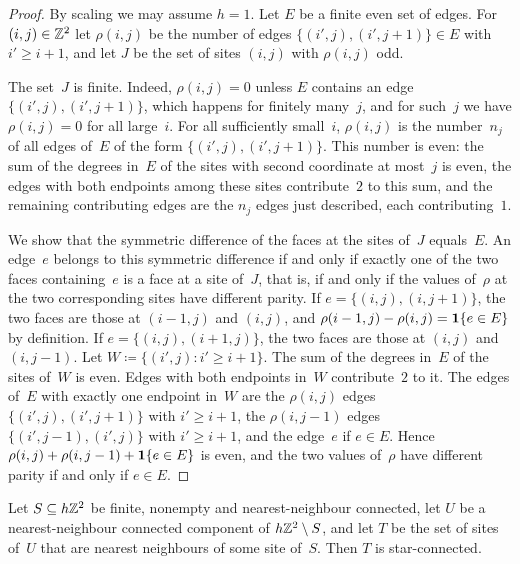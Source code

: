 \documentclass[11pt,letterpaper]{article}
\begin{document}
\begin{proof}
By scaling we may assume $h=1$. Let $E$ be a finite even set of edges. For $(i,j)\in\mathbb Z^2$ let $\rho(i,j)$ be the number of edges $\{(i',j),(i',j+1)\}\in E$ with $i'\ge i+1$, and let $J$ be the set of sites $(i,j)$ with $\rho(i,j)$ odd.

The set~$J$ is finite. Indeed, $\rho(i,j)=0$ unless $E$ contains an edge $\{(i',j),(i',j+1)\}$, which happens for finitely many~$j$, and for such~$j$ we have $\rho(i,j)=0$ for all large~$i$. For all sufficiently small~$i$, $\rho(i,j)$ is the number~$n_j$ of all edges of~$E$ of the form $\{(i',j),(i',j+1)\}$. This number is even: the sum of the degrees in~$E$ of the sites with second coordinate at most~$j$ is even, the edges with both endpoints among these sites contribute~$2$ to this sum, and the remaining contributing edges are the $n_j$ edges just described, each contributing~$1$.

We show that the symmetric difference of the faces at the sites of~$J$ equals~$E$. An edge~$e$ belongs to this symmetric difference if and only if exactly one of the two faces containing~$e$ is a face at a site of~$J$, that is, if and only if the values of~$\rho$ at the two corresponding sites have different parity. If $e=\{(i,j),(i,j+1)\}$, the two faces are those at $(i-1,j)$ and $(i,j)$, and $\rho(i-1,j)-\rho(i,j)=\mathbf{1}\{e\in E\}$ by definition. If $e=\{(i,j),(i+1,j)\}$, the two faces are those at $(i,j)$ and $(i,j-1)$. Let $W\coloneqq\{(i',j)\colon i'\ge i+1\}$. The sum of the degrees in~$E$ of the sites of~$W$ is even. Edges with both endpoints in~$W$ contribute~$2$ to it. The edges of~$E$ with exactly one endpoint in~$W$ are the $\rho(i,j)$ edges $\{(i',j),(i',j+1)\}$ with $i'\ge i+1$, the $\rho(i,j-1)$ edges $\{(i',j-1),(i',j)\}$ with $i'\ge i+1$, and the edge~$e$ if $e\in E$. Hence $\rho(i,j)+\rho(i,j-1)+\mathbf{1}\{e\in E\}$ is even, and the two values of~$\rho$ have different parity if and only if $e\in E$.
\end{proof}

\begin{lemma}
\label{lem:exterior-boundary}
Let $S\subseteq h\mathbb Z^2$ be finite, nonempty and nearest-neighbour connected, let $U$ be a nearest-neighbour connected component of $h\mathbb Z^2\setminus S$, and let $T$ be the set of sites of~$U$ that are nearest neighbours of some site of~$S$. Then $T$ is star-connected.
\end{lemma}
\end{document}
